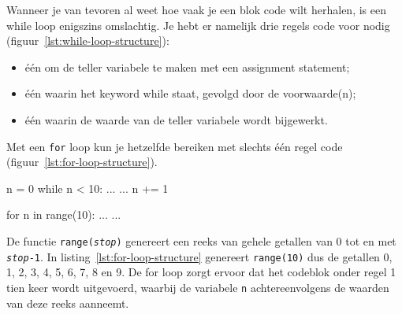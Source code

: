 \documentclass[../main]{subfiles}
\begin{document}
Wanneer je van tevoren al weet hoe vaak je een blok code wilt herhalen, is een while loop enigszins omslachtig. Je hebt er namelijk drie regels code voor nodig (figuur~\ref{lst:while-loop-structure}):
\begin{itemize}[topsep=2pt, itemsep=2pt, parsep=0pt]
\item één om de teller variabele te maken met een assignment statement;
\item één waarin het keyword while staat, gevolgd door de voorwaarde(n);
\item één waarin de waarde van de teller variabele wordt bijgewerkt.
\end{itemize}
Met een \texttt{for} loop kun je hetzelfde bereiken met slechts één regel code (figuur~\ref{lst:for-loop-structure}).

\noindent\begin{minipage}[t]{.45\textwidth}
\begin{python}[style=mu, caption={Een standaard while loop}, label={lst:while-loop-structure}]
n = 0
while n < 10:
    ...
    ...
    n += 1
\end{python}
\end{minipage}\hfill
\begin{minipage}[t]{.45\textwidth}
\begin{python}[style=mu, caption={Een for loop}, label={lst:for-loop-structure}]
for n in range(10):
    ...
    ...
\end{python}
\end{minipage}




De functie \texttt{range(\textit{stop})} genereert een reeks van gehele getallen van 0 tot en met \texttt{\textit{stop}-1}. In listing~\ref{lst:for-loop-structure} genereert \texttt{range(10)} dus de getallen 0, 1, 2, 3, 4, 5, 6, 7, 8 en 9. De for loop zorgt ervoor dat het codeblok onder regel 1 tien keer wordt uitgevoerd, waarbij de variabele \texttt{n} achtereenvolgens de waarden van deze reeks aanneemt.
\end{document}
